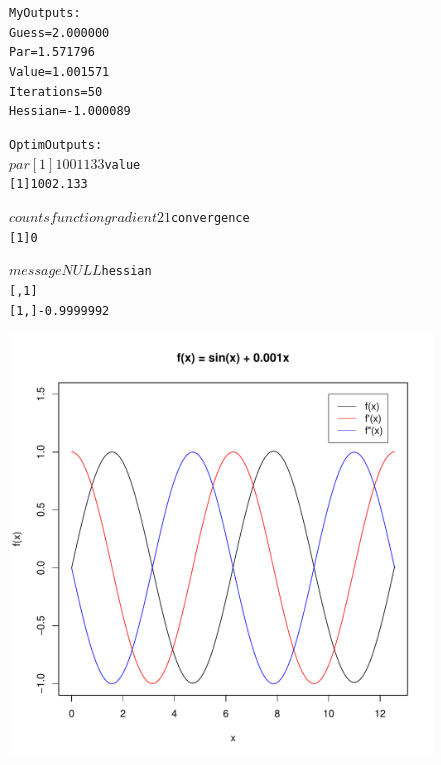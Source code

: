 \documentclass{article}
\begin{document}
\begin{figure}
	\begin{center}
		\begin{minipage}[h!]{0.2\textwidth}
			\begin{alltt}
				My Outputs:
				Guess      = 2.000000
				Par        = 1.571796
				Value      = 1.001571
				Iterations = 50
				Hessian    = -1.000089			
			\end{alltt}
		\end{minipage}
		\begin{minipage}[h!]{0.19\textwidth}
			\begin{alltt}
				Optim Outputs:
				$par
				[1] 1001133
				
				$value
				[1] 1002.133
				
				$counts
				function gradient 
				       2        1 
				
				$convergence
				[1] 0
				
				$message
				NULL
				
				$hessian
				           [,1]
				[1,] -0.9999992
			\end{alltt}
		\end{minipage}	
		\begin{minipage}[h!]{0.6\textwidth}
			\includegraphics[width=\textwidth]{triggy.pdf}	
		\end{minipage}			
	\end{center}
\end{figure}
\end{document}
